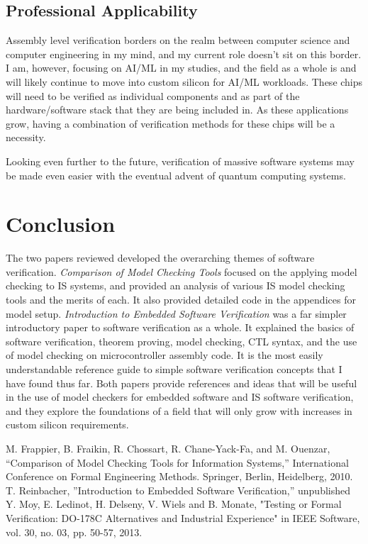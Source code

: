 \documentclass[conference]{IEEEtran}
\begin{document}
\subsection{Professional Applicability}
Assembly level verification borders on the realm between computer science and computer engineering in my mind, and my current role doesn't sit on this border. I am, however, focusing on AI/ML in my studies, and the field as a whole is and will likely continue to move into custom silicon for AI/ML workloads. These chips will need to be verified as individual components and as part of the hardware/software stack that they are being included in. As these applications grow, having a combination of verification methods for these chips will be a necessity.

Looking even further to the future, verification of massive software systems may be made even easier with the eventual advent of quantum computing systems.

\section{Conclusion}
The two papers reviewed developed the overarching themes of software verification. \emph{Comparison of Model Checking Tools} focused on the applying model checking to IS systems, and provided an analysis of various IS model checking tools and the merits of each. It also provided detailed code in the appendices for model setup. \emph{Introduction to Embedded Software Verification} was a far simpler introductory paper to software verification as a whole. It explained the basics of software verification, theorem proving, model checking, CTL syntax, and the use of model checking on microcontroller assembly code. It is the most easily understandable reference guide to simple software verification concepts that I have found thus far. Both papers provide references and ideas that will be useful in the use of model checkers for embedded software and IS software verification, and they explore the foundations of a field that will only grow with increases in custom silicon requirements.


\begin{thebibliography}{00}
 M. Frappier, B. Fraikin, R. Chossart, R. Chane-Yack-Fa, and M. Ouenzar, ``Comparison of Model Checking Tools for Information Systems,'' International Conference on Formal Engineering Methods. Springer, Berlin, Heidelberg, 2010.
 T. Reinbacher, ''Introduction to Embedded Software Verification,'' unpublished
 Y. Moy, E. Ledinot, H. Delseny, V. Wiels and B. Monate, "Testing or Formal Verification: DO-178C Alternatives and Industrial Experience" in IEEE Software, vol. 30, no. 03, pp. 50-57, 2013.
\end{thebibliography}
\end{document}
